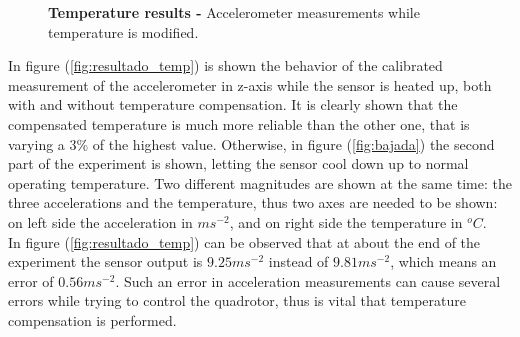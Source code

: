 \documentclass[conference]{IEEEtran}
\newcommand{\refp}[1]{(\ref{#1})}
\begin{document}
\begin{figure}[h!]
	\caption{\textbf{Temperature results -} Accelerometer measurements while temperature is modified.}
	\label{fig:temp_res}
\end{figure}

In figure \refp{fig:resultado_temp} is shown the behavior of the calibrated measurement of the accelerometer in z-axis while the sensor is heated up, both with and without temperature compensation. It is clearly shown that the compensated temperature is much more reliable than the other one, that is varying a 3\% of the highest value. Otherwise, in figure \refp{fig:bajada} the second part of the experiment is shown, letting the sensor cool down up to normal operating temperature. Two different magnitudes are shown at the same time: the three accelerations and the temperature, thus two axes are needed to be shown: on left side the acceleration in $ms^{-2}$, and on right side the temperature in $^oC$.\\
In figure \refp{fig:resultado_temp} can be observed that at about the end of the experiment the sensor output is $9.25ms^{-2}$ instead of $9.81ms^{-2}$, which means an error of $0.56ms^{-2}$. Such an error in acceleration measurements can cause several errors while trying to control the quadrotor, thus is vital that temperature compensation is performed.
\end{document}

